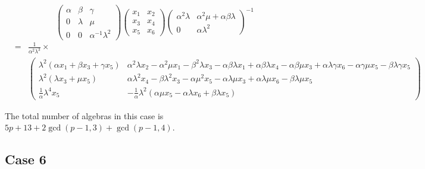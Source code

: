 \documentclass[10pt,thmsa]{article}
\begin{document}
\[
\left( 
\begin{array}{lll}
\alpha & \beta & \gamma \\ 
0 & \lambda & \mu \\ 
0 & 0 & \alpha ^{-1}\lambda ^{2}%
\end{array}%
\right) \left( 
\begin{array}{cc}
x_{1} & x_{2} \\ 
x_{3} & x_{4} \\ 
x_{5} & x_{6}%
\end{array}%
\right) \left( 
\begin{array}{ll}
\alpha ^{2}\lambda & \alpha ^{2}\mu +\alpha \beta \lambda \\ 
0 & \alpha \lambda ^{2}%
\end{array}%
\right) ^{-1} 
\]
\begin{eqnarray*}
&=&\frac{1}{\alpha ^{2}\lambda ^{3}}\times \\
&&\left( 
\begin{array}{cc}
\lambda ^{2}\left( \alpha x_{1}+\beta x_{3}+\gamma x_{5}\right) & \alpha
^{2}\lambda x_{2}-\alpha ^{2}\mu x_{1}-\beta ^{2}\lambda x_{3}-\alpha \beta
\lambda x_{1}+\alpha \beta \lambda x_{4}-\alpha \beta \mu x_{3}+\alpha
\lambda \gamma x_{6}-\alpha \gamma \mu x_{5}-\beta \lambda \gamma x_{5} \\ 
\lambda ^{2}\left( \lambda x_{3}+\mu x_{5}\right) & \alpha \lambda
^{2}x_{4}-\beta \lambda ^{2}x_{3}-\alpha \mu ^{2}x_{5}-\alpha \lambda \mu
x_{3}+\alpha \lambda \mu x_{6}-\beta \lambda \mu x_{5} \\ 
\frac{1}{\alpha }\lambda ^{4}x_{5} & -\frac{1}{\alpha }\lambda ^{2}\left(
\alpha \mu x_{5}-\alpha \lambda x_{6}+\beta \lambda x_{5}\right)%
\end{array}%
\right)
\end{eqnarray*}%
$\allowbreak \allowbreak $

The total number of algebras in this case is $5p+13+2\gcd (p-1,3)+\gcd
(p-1,4)$.

\subsection{Case 6}
\end{document}
